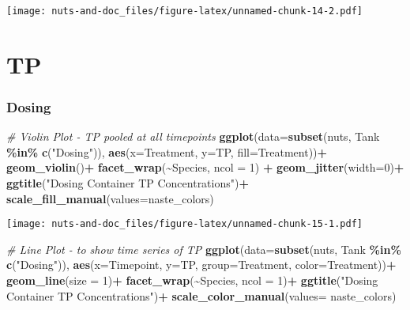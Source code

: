 \documentclass[
]{article}
\newenvironment{Shaded}{\begin{snugshade}}{\end{snugshade}}
\newcommand{\AttributeTok}[1]{\textcolor[rgb]{0.13,0.29,0.53}{#1}}
\newcommand{\CommentTok}[1]{\textcolor[rgb]{0.56,0.35,0.01}{\textit{#1}}}
\newcommand{\DecValTok}[1]{\textcolor[rgb]{0.00,0.00,0.81}{#1}}
\newcommand{\FunctionTok}[1]{\textcolor[rgb]{0.13,0.29,0.53}{\textbf{#1}}}
\newcommand{\NormalTok}[1]{#1}
\newcommand{\SpecialCharTok}[1]{\textcolor[rgb]{0.81,0.36,0.00}{\textbf{#1}}}
\newcommand{\StringTok}[1]{\textcolor[rgb]{0.31,0.60,0.02}{#1}}
\begin{document}
\texttt{[image: nuts-and-doc\_files/figure-latex/unnamed-chunk-14-2.pdf]}

\hypertarget{tp}{%
\section{TP}\label{tp}}

\hypertarget{dosing-5}{%
\subsubsection{Dosing}\label{dosing-5}}

\begin{Shaded}
\begin{Highlighting}[]
\CommentTok{\# Violin Plot {-} TP pooled at all timepoints}
\FunctionTok{ggplot}\NormalTok{(}\AttributeTok{data=}\FunctionTok{subset}\NormalTok{(nuts, Tank }\SpecialCharTok{\%in\%} \FunctionTok{c}\NormalTok{(}\StringTok{"Dosing"}\NormalTok{)), }\FunctionTok{aes}\NormalTok{(}\AttributeTok{x=}\NormalTok{Treatment, }\AttributeTok{y=}\NormalTok{TP, }\AttributeTok{fill=}\NormalTok{Treatment))}\SpecialCharTok{+}
  \FunctionTok{geom\_violin}\NormalTok{()}\SpecialCharTok{+}
  \FunctionTok{facet\_wrap}\NormalTok{(}\SpecialCharTok{\textasciitilde{}}\NormalTok{Species, }\AttributeTok{ncol =} \DecValTok{1}\NormalTok{) }\SpecialCharTok{+}
  \FunctionTok{geom\_jitter}\NormalTok{(}\AttributeTok{width=}\DecValTok{0}\NormalTok{)}\SpecialCharTok{+}
  \FunctionTok{ggtitle}\NormalTok{(}\StringTok{"Dosing Container TP Concentrations"}\NormalTok{)}\SpecialCharTok{+}
  \FunctionTok{scale\_fill\_manual}\NormalTok{(}\AttributeTok{values=}\NormalTok{naste\_colors)}
\end{Highlighting}
\end{Shaded}

\texttt{[image: nuts-and-doc\_files/figure-latex/unnamed-chunk-15-1.pdf]}

\begin{Shaded}
\begin{Highlighting}[]
\CommentTok{\# Line Plot {-} to show time series of TP}
\FunctionTok{ggplot}\NormalTok{(}\AttributeTok{data=}\FunctionTok{subset}\NormalTok{(nuts, Tank }\SpecialCharTok{\%in\%} \FunctionTok{c}\NormalTok{(}\StringTok{"Dosing"}\NormalTok{)), }\FunctionTok{aes}\NormalTok{(}\AttributeTok{x=}\NormalTok{Timepoint, }\AttributeTok{y=}\NormalTok{TP, }\AttributeTok{group=}\NormalTok{Treatment, }\AttributeTok{color=}\NormalTok{Treatment))}\SpecialCharTok{+}
  \FunctionTok{geom\_line}\NormalTok{(}\AttributeTok{size =} \DecValTok{1}\NormalTok{)}\SpecialCharTok{+}
  \FunctionTok{facet\_wrap}\NormalTok{(}\SpecialCharTok{\textasciitilde{}}\NormalTok{Species, }\AttributeTok{ncol =} \DecValTok{1}\NormalTok{)}\SpecialCharTok{+}
  \FunctionTok{ggtitle}\NormalTok{(}\StringTok{"Dosing Container TP Concentrations"}\NormalTok{)}\SpecialCharTok{+}
  \FunctionTok{scale\_color\_manual}\NormalTok{(}\AttributeTok{values=}\NormalTok{ naste\_colors)}
\end{Highlighting}
\end{Shaded}
\end{document}
